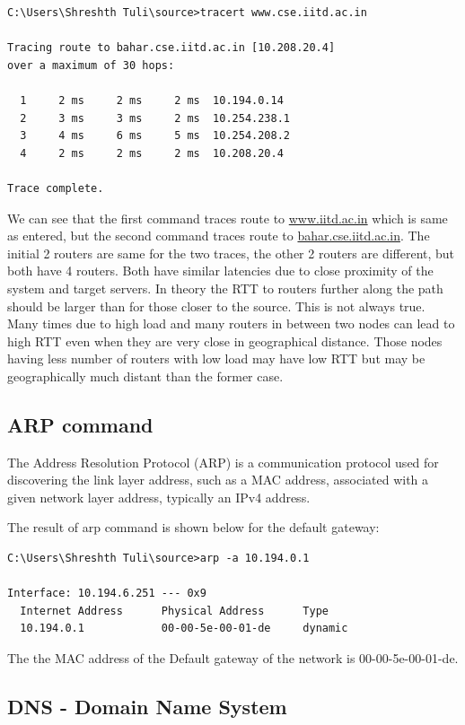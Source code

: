 \documentclass[a4paper, 11pt]{article}
\begin{document}
\begin{lstlisting}[style=BashInputStyle]
C:\Users\Shreshth Tuli\source>tracert www.cse.iitd.ac.in

Tracing route to bahar.cse.iitd.ac.in [10.208.20.4]
over a maximum of 30 hops:

  1     2 ms     2 ms     2 ms  10.194.0.14
  2     3 ms     3 ms     2 ms  10.254.238.1
  3     4 ms     6 ms     5 ms  10.254.208.2
  4     2 ms     2 ms     2 ms  10.208.20.4

Trace complete.
\end{lstlisting}

We can see that the first command traces route to \url{www.iitd.ac.in} which is same as entered, but the second command traces route to \url{bahar.cse.iitd.ac.in}. The initial 2 routers are same for the two traces, the other 2 routers are different, but both have 4 routers. Both have similar latencies due to close proximity of the system and target servers. In theory the RTT to routers further along the path should be larger than for those closer to the source. This is not always true. Many times due to high load and many routers in between two nodes can lead to high RTT even when they are very close in geographical distance. Those nodes having less number of routers with low load may have low RTT but may be geographically much distant than the former case.

\subsection{ARP command}

The Address Resolution Protocol (ARP) is a communication protocol used for discovering the link layer address, such as a MAC address, associated with a given network layer address, typically an IPv4 address.

The result of arp command is shown below for the default gateway:

\begin{lstlisting}[style=BashInputStyle]
C:\Users\Shreshth Tuli\source>arp -a 10.194.0.1

Interface: 10.194.6.251 --- 0x9
  Internet Address      Physical Address      Type
  10.194.0.1            00-00-5e-00-01-de     dynamic
\end{lstlisting}
The the MAC address of the Default gateway of the network is 00-00-5e-00-01-de.


\subsection{DNS - Domain Name System}
\end{document}
